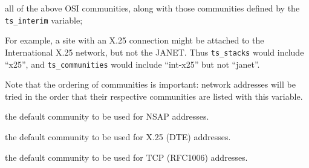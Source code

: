 \begin{describe}
\begin{describe}
\item[\verb"all":] all of the above OSI communities, along with those
communities defined by the \verb"ts_interim" variable;
\end{describe}
For example,
a site with an X.25 connection might be attached to the International X.25
network, but not the JANET.
Thus \verb"ts_stacks" would include ``x25'',
and \verb"ts_communities" would include ``int-x25'' but not ``janet''.

Note that the ordering of communities is important:
network addresses will be tried in the order that their respective
communities are listed with this variable.

\item[\verb"default\_nsap\_community":] the default community to be
used for NSAP addresses.

\item[\verb"default\_x25\_community":] the default community to be
used for X.25 (DTE) addresses.

\item[\verb"default\_tcp\_community":] the default community to be
used for TCP (RFC1006) addresses.
\end{describe}

